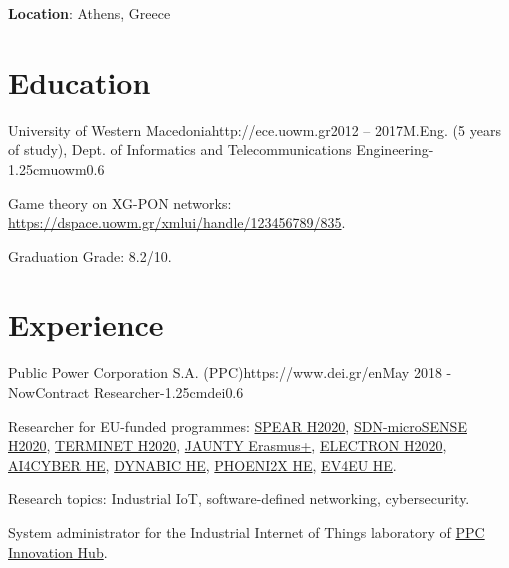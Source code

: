 \documentclass{mycv}
\begin{document}
	\thispagestyle{plain}

	\textbf{Location}: Athens, Greece

	\section{Education}
	
	\begin{EntryDatedLogo}{University of Western Macedonia}{http://ece.uowm.gr}{2012 -- 2017}{M.Eng. (5 years of study), Dept. of Informatics and Telecommunications Engineering}{-1.25cm}{uowm}{0.6}
		\begin{Itemize}
			\item Game theory on XG-PON networks: \url{https://dspace.uowm.gr/xmlui/handle/123456789/835}.
			\item Graduation Grade: 8.2/10.
		\end{Itemize}
	\end{EntryDatedLogo}
	
	\section{Experience}
		\begin{EntryDatedLogo}{Public Power Corporation S.A. (PPC)}{https://www.dei.gr/en}{May 2018 - Now}{Contract Researcher}{-1.25cm}{dei}{0.6}
		\begin{Itemize}
			\item Researcher for EU-funded programmes: \href{https://cordis.europa.eu/project/id/787011}{SPEAR H2020}, \href{https://cordis.europa.eu/project/id/833955}{SDN-microSENSE H2020}, \href{https://cordis.europa.eu/project/id/957406}{TERMINET H2020}, \href{https://www.jaunty.eu/}{JAUNTY Erasmus+}, \href{https://cordis.europa.eu/project/id/101021936}{ELECTRON H2020}, \href{https://cordis.europa.eu/project/id/101070450}{AI4CYBER HE}, \href{https://cordis.europa.eu/project/id/101070455}{DYNABIC HE}, \href{https://cordis.europa.eu/project/id/101070586}{PHOENI2X HE}, \href{https://cordis.europa.eu/project/id/101056765}{EV4EU HE}.
			\item Research topics: Industrial IoT, software-defined networking, cybersecurity.
			\item System administrator for the Industrial Internet of Things laboratory of \href{https://innovationhub.dei.gr/el/}{PPC Innovation Hub}.
		\end{Itemize}
	\end{EntryDatedLogo}
	
\end{document}

